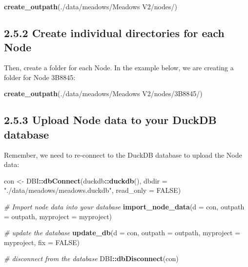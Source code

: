 \documentclass[
]{book}
\newenvironment{Shaded}{\begin{snugshade}}{\end{snugshade}}
\newcommand{\AttributeTok}[1]{\textcolor[rgb]{0.13,0.29,0.53}{#1}}
\newcommand{\CommentTok}[1]{\textcolor[rgb]{0.56,0.35,0.01}{\textit{#1}}}
\newcommand{\ConstantTok}[1]{\textcolor[rgb]{0.56,0.35,0.01}{#1}}
\newcommand{\FunctionTok}[1]{\textcolor[rgb]{0.13,0.29,0.53}{\textbf{#1}}}
\newcommand{\NormalTok}[1]{#1}
\newcommand{\OtherTok}[1]{\textcolor[rgb]{0.56,0.35,0.01}{#1}}
\newcommand{\SpecialCharTok}[1]{\textcolor[rgb]{0.81,0.36,0.00}{\textbf{#1}}}
\newcommand{\StringTok}[1]{\textcolor[rgb]{0.31,0.60,0.02}{#1}}
\begin{document}
\begin{Shaded}
\begin{Highlighting}[]
\FunctionTok{create\_outpath}\NormalTok{(}\StringTok{\textquotesingle{}./data/meadows/Meadows V2/nodes/\textquotesingle{}}\NormalTok{)}
\end{Highlighting}
\end{Shaded}

\subsection{2.5.2 Create individual directories for each Node}\label{create-individual-directories-for-each-node}

Then, create a folder for each Node. In the example below, we are creating a folder for Node 3B8845:

\begin{Shaded}
\begin{Highlighting}[]
\FunctionTok{create\_outpath}\NormalTok{(}\StringTok{\textquotesingle{}./data/meadows/Meadows V2/nodes/3B8845/\textquotesingle{}}\NormalTok{)}
\end{Highlighting}
\end{Shaded}

\subsection{2.5.3 Upload Node data to your DuckDB database}\label{upload-node-data-to-your-duckdb-database}

Remember, we need to re-connect to the DuckDB database to upload the Node data:

\begin{Shaded}
\begin{Highlighting}[]
\NormalTok{con }\OtherTok{\textless{}{-}}\NormalTok{ DBI}\SpecialCharTok{::}\FunctionTok{dbConnect}\NormalTok{(duckdb}\SpecialCharTok{::}\FunctionTok{duckdb}\NormalTok{(), }
                      \AttributeTok{dbdir =} \StringTok{"./data/meadows/meadows.duckdb"}\NormalTok{, }
                      \AttributeTok{read\_only =} \ConstantTok{FALSE}\NormalTok{)}

\CommentTok{\# Import node data into your database}
\FunctionTok{import\_node\_data}\NormalTok{(}\AttributeTok{d =}\NormalTok{ con,}
                 \AttributeTok{outpath =}\NormalTok{ outpath,}
                 \AttributeTok{myproject =}\NormalTok{ myproject)}

\CommentTok{\# update the database}
\FunctionTok{update\_db}\NormalTok{(}\AttributeTok{d =}\NormalTok{ con,}
          \AttributeTok{outpath =}\NormalTok{ outpath,}
          \AttributeTok{myproject =}\NormalTok{ myproject,}
          \AttributeTok{fix =} \ConstantTok{FALSE}\NormalTok{)}

\CommentTok{\# disconnect from the database}
\NormalTok{DBI}\SpecialCharTok{::}\FunctionTok{dbDisconnect}\NormalTok{(con)}
\end{Highlighting}
\end{Shaded}
\end{document}
